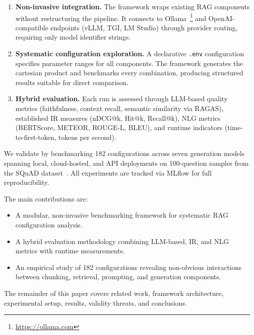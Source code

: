 \begin{enumerate}
  \item \textbf{Non-invasive integration.} The framework wraps existing RAG components without restructuring the pipeline. It connects to Ollama~\footnote{\url{https://ollama.com}} and OpenAI-compatible endpoints (vLLM, TGI, LM Studio) through provider routing, requiring only model identifier strings.
  \item \textbf{Systematic configuration exploration.} A declarative \texttt{.env} configuration specifies parameter ranges for all components. The framework generates the cartesian product and benchmarks every combination, producing structured results suitable for direct comparison.
  \item \textbf{Hybrid evaluation.} Each run is assessed through LLM-based quality metrics (faithfulness, context recall, semantic similarity via RAGAS), established IR measures (nDCG@k, Hit@k, Recall@k), NLG metrics (BERTScore, METEOR, ROUGE-L, BLEU), and runtime indicators (time-to-first-token, tokens per second).
\end{enumerate}

We validate \toolname{} by benchmarking 182 configurations across seven generation models spanning local, cloud-hosted, and API deployments on 100-question samples from the SQuAD dataset~\cite{rajpurkar2016squad}. All experiments are tracked via MLflow for full reproducibility.

The main contributions are:
\begin{itemize}
  \item A modular, non-invasive benchmarking framework for systematic RAG configuration analysis.
  \item A hybrid evaluation methodology combining LLM-based, IR, and NLG metrics with runtime measurements.
  \item An empirical study of 182 configurations revealing non-obvious interactions between chunking, retrieval, prompting, and generation components.
\end{itemize}

The remainder of this paper covers related work, framework architecture, experimental setup, results, validity threats, and conclusions.
